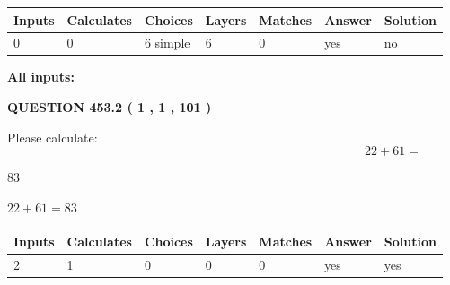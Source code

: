 \documentclass[12pt]{article}
\begin{document}
 
   
   
   
   
\noindent\begin{tabular}{|l|l|l|l|l|l|l|}
 \hline
Inputs & Calculates & Choices & Layers & Matches & Answer & Solution \\ \hline
 0  & 
 0  & 
 6
  simple  
  & 
 6  & 
 0  & 
  yes & 
  no 
  \\ \hline
 \end{tabular}
   
   
   
   
\noindent{}
   
   
   
   
\noindent\vspace{0.1in}\hspace{-0.08in} {\textbf{\Large{All inputs: }}}
   
   
  
\vspace{0.2in}
  
{\textbf{\Large{QUESTION
453.2 
 ( 1 , 1 , 101 )
}}}
  
  
 
Please calculate:
\begin{equation}
22 +  %
61 = \nonumber
\end{equation}
 
 
 
\noindent{}
 
 

83
 
 
\noindent{}
 
 

 
 
 
\noindent{}
 
 

$ %
22 +  %
61=   %
83$
 
 
\noindent{}
 
 

 
   
   
   
   
\noindent\begin{tabular}{|l|l|l|l|l|l|l|}
 \hline
Inputs & Calculates & Choices & Layers & Matches & Answer & Solution \\ \hline
 2  & 
 1  & 
 0
  & 
 0  & 
 0  & 
  yes & 
  yes 
  \\ \hline
 \end{tabular}
   
\end{document}
